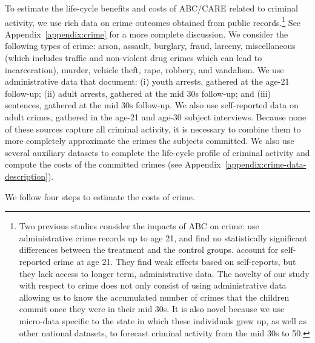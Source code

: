 To estimate the life-cycle benefits and costs of ABC/CARE related to criminal activity, we use rich data on crime outcomes obtained from public records.\footnote{Two previous studies consider the impacts of ABC on crime: \citet{Clarke_Campbell_1998_ABC_Comparison_ECRQ} use administrative crime records up to age 21, and find no statistically significant differences between the treatment and the control groups. \cite{Barnett_Masse_2002_benefitcost,Barnett_Masse_2007_EER} account for self-reported crime at age 21. They find weak effects based on self-reports, but they lack access to longer term, administrative data. The novelty of our study with respect to crime does not only consist of using administrative data allowing us to know the accumulated number of crimes that the children commit once they were in their mid 30s. It is also novel because we use micro-data specific to the state in which these individuals grew up, as well as other national datasets, to forecast criminal activity from the mid 30s to 50.} See Appendix~\ref{appendix:crime} for a more complete discussion. We consider the following types of crime: arson, assault, burglary, fraud, larceny, miscellaneous (which includes traffic and non-violent drug crimes which can lead to incarceration), murder, vehicle theft, rape, robbery, and vandalism. We use administrative data that document: (i) youth arrests, gathered at the age-21 follow-up; (ii) adult arrests, gathered at the mid 30s follow-up; and (iii) sentences, gathered at the mid 30s follow-up. We also use self-reported data on adult crimes, gathered in the age-21 and age-30 subject interviews. Because none of these sources capture all criminal activity, it is necessary to combine them to more completely approximate the crimes the subjects committed. We also use several auxiliary datasets to complete the life-cycle profile of criminal activity and compute the costs of the committed crimes (see Appendix~\ref{appendix:crime-data-description}).

We follow four steps to estimate the costs of crime.

